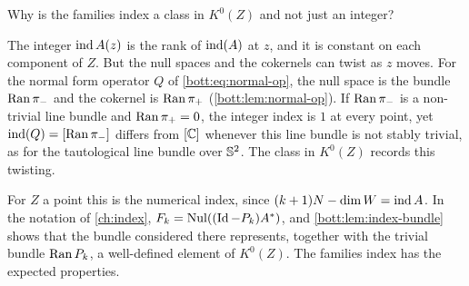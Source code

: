 \begin{question}
  Why is the families index a class in $K^0(Z)$ and not just an integer?
\end{question}
\begin{answer}
  The integer $\operatorname{ind} A(z)$ is the rank of $\operatorname{ind}(A)$ at $z$, and it is constant on
  each component of $Z$. But the null spaces and the cokernels can twist as $z$
  moves. For the normal form operator $Q$ of \eqref{bott:eq:normal-op}, the null
  space is the bundle $\operatorname{Ran}\pi_-$ and the cokernel is $\operatorname{Ran}\pi_+$
  (\cref{bott:lem:normal-op}). If $\operatorname{Ran}\pi_-$ is a non-trivial line bundle and
  $\operatorname{Ran}\pi_+=0$, the integer index is $1$ at every point, yet
  $\operatorname{ind}(Q)=[\operatorname{Ran}\pi_-]$ differs from $[\mathbb{C}]$ whenever this line bundle is not
  stably trivial, as for the tautological line bundle over $\mathbb{S}^2$. The class
  in $K^0(Z)$ records this twisting.
\end{answer}

For $Z$ a point this is the numerical index, since $(k+1)N-\dim W=\operatorname{ind} A$. In the
notation of \cref{ch:index}, $F_k=\operatorname{Nul}((\operatorname{Id}-P_k)A^*)$, and \cref{bott:lem:index-bundle}
shows that the bundle considered there represents, together with the trivial bundle
$\operatorname{Ran} P_k$, a well-defined element of $K^0(Z)$. The families index has the expected
properties.

